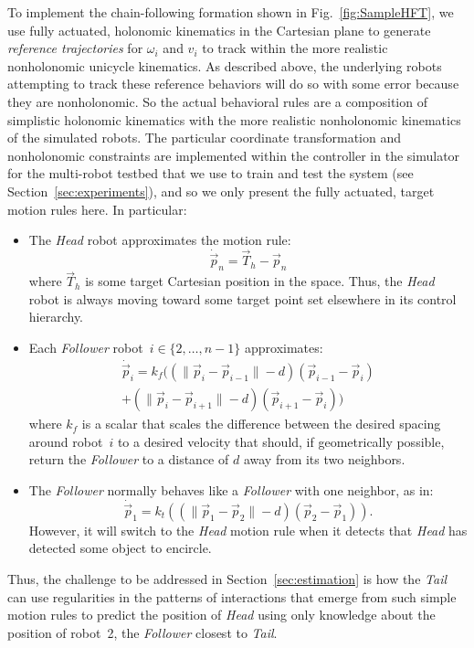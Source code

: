 \documentclass[letterpaper, 10 pt, conference]{ieeeconf}  %
\begin{document}
	To implement the chain-following formation shown in
	Fig.~\ref{fig:SampleHFT}, we use fully actuated, holonomic kinematics
	in the Cartesian plane to generate \emph{reference trajectories} for
	$\omega_i$ and $v_i$ to track within the more realistic nonholonomic
	unicycle kinematics. As described above, the underlying robots
	attempting to track these reference behaviors will do so with some error
	because they are nonholonomic. So the actual behavioral rules are a
	composition of simplistic holonomic kinematics with the more realistic
	nonholonomic kinematics of the simulated robots. The particular
	coordinate transformation and nonholonomic constraints are implemented
	within the controller in the simulator for the multi-robot testbed that
	we use to train and test the system (see Section~\ref{sec:experiments}),
	and so we only present the fully actuated, target motion rules here. In
	particular:
	\begin{itemize}
		\item The \emph{Head} robot approximates the motion rule:
		\begin{equation*}
			\dot{\vec{p}}_n = \vec{T}_h - \vec{p}_n
		\end{equation*}
		where $\vec{T}_h$ is some target Cartesian position in the space.
		Thus, the \emph{Head} robot is always moving toward some target
		point set elsewhere in its control hierarchy.
		
		\item Each \emph{Follower} robot~$i \in \{2,\ldots,n-1\}$
		approximates:
		\begin{multline*}
			\dot{\vec{p}}_i
			=
			k_f(
			(\|\vec{p}_i - \vec{p}_{i-1}\| - d)
			(\vec{p}_{i-1} - \vec{p}_i)\\
			+
			(\|\vec{p}_i - \vec{p}_{i+1}\| - d)
			(\vec{p}_{i+1} - \vec{p}_i)
			)
		\end{multline*}
		where $k_f$ is a scalar that scales the difference between the
		desired spacing around robot~$i$ to a desired velocity that
		should, if geometrically possible, return the \emph{Follower} to
		a distance of $d$ away from its two neighbors.
		
		\item The \emph{Follower} normally behaves like a \emph{Follower}
		with one neighbor, as in:
		\begin{equation*}
			\dot{\vec{p}}_1
			=
			k_t(
			(\|\vec{p}_1 - \vec{p}_{2}\| - d)(\vec{p}_{2} - \vec{p}_1)
			).
		\end{equation*}
		However, it will switch to the \emph{Head} motion rule when it
		detects that \emph{Head} has detected some object to encircle.
		
	\end{itemize}
	Thus, the challenge to be addressed in Section~\ref{sec:estimation} is
	how the \emph{Tail} can use regularities in the patterns of interactions
	that emerge from such simple motion rules to predict the position of
	\emph{Head} using only knowledge about the position of robot~2, the
	\emph{Follower} closest to \emph{Tail}.
	
\end{document}
